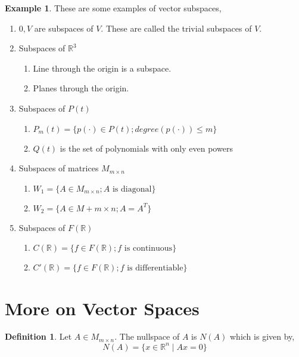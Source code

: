 \documentclass{report}
\theoremstyle{definition}
\newtheorem{_def}{Definition}
\newtheorem{ex}{Example}
\begin{document}
\begin{ex}
These are some examples of vector subspaces,
\begin{enumerate}
 \item ${0}, V$ are subspaces of $V$.
 These are called the trivial subspaces of $V$.
 \item Subspaces of $\mathbb{R}^3$
 \begin{enumerate}[i]
  \item Line through the origin is a subspace.
  \item Planes through the origin.
 \end{enumerate}
 \item Subspaces of $P(t)$
 \begin{enumerate}[i]
  \item $P_m(t)=\{p(\cdot)\in P(t); degree(p(\cdot))\leq m\}$
  \item $Q(t)$ is the set of polynomials with only even powers
 \end{enumerate}
 \item Subspaces of matrices $M_{m\times n}$
 \begin{enumerate}[i]
  \item $W_1=\{A\in M_{m\times n}; A \text{ is diagonal}\}$
  \item $W_2=\{A\in M+{m\times n}; A=A^T\}$
 \end{enumerate}
 \item Subspaces of $F(\mathbb{R})$
 \begin{enumerate}[i]
  \item $C(\mathbb{R})=\{f\in F(\mathbb{R}); f \text{ is continuous}\}$
  \item $C'(\mathbb{R})=\{f\in F(\mathbb{R}); f \text{ is differentiable}\}$
 \end{enumerate}
\end{enumerate}
\end{ex}

\section{More on Vector Spaces}

\begin{_def}
Let $A\in M_{m\times n}$. The nullspace of $A$ is $N(A)$ which is given by,
\[N(A)=\{x\in \mathbb{R}^n \mid Ax=0\}\]
\end{_def}
\end{document}
